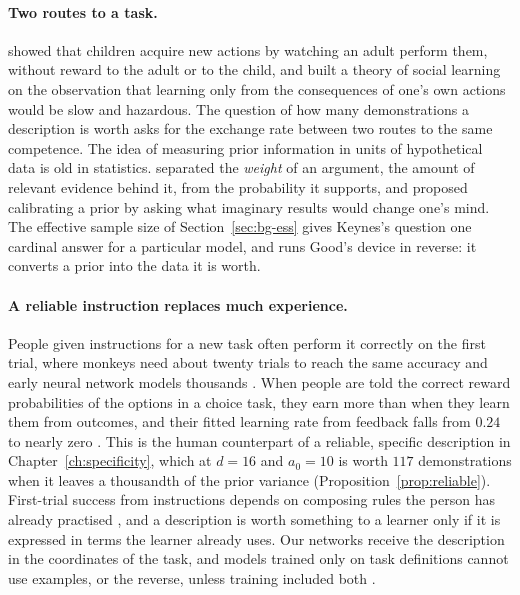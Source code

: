 \paragraph{Two routes to a task.} \citet{bandura1961} showed that children acquire new actions by watching an adult perform them, without reward to the adult or to the child, and \citet{bandura1977} built a theory of social learning on the observation that learning only from the consequences of one's own actions would be slow and hazardous. The question of how many demonstrations a description is worth asks for the exchange rate between two routes to the same competence. The idea of measuring prior information in units of hypothetical data is old in statistics. \citet{keynes1921} separated the \emph{weight} of an argument, the amount of relevant evidence behind it, from the probability it supports, and \citet{good1950} proposed calibrating a prior by asking what imaginary results would change one's mind. The effective sample size of Section~\ref{sec:bg-ess} gives Keynes's question one cardinal answer for a particular model, and runs Good's device in reverse: it converts a prior into the data it is worth.

\paragraph{A reliable instruction replaces much experience.} People given instructions for a new task often perform it correctly on the first trial, where monkeys need about twenty trials to reach the same accuracy and early neural network models thousands \citep{cole2013}. When people are told the correct reward probabilities of the options in a choice task, they earn more than when they learn them from outcomes, and their fitted learning rate from feedback falls from $0.24$ to nearly zero \citep{li2011}. This is the human counterpart of a reliable, specific description in Chapter~\ref{ch:specificity}, which at $d = 16$ and $a_0 = 10$ is worth $117$ demonstrations when it leaves a thousandth of the prior variance (Proposition~\ref{prop:reliable}). First-trial success from instructions depends on composing rules the person has already practised \citep{cole2013}, and a description is worth something to a learner only if it is expressed in terms the learner already uses. Our networks receive the description in the coordinates of the task, and models trained only on task definitions cannot use examples, or the reverse, unless training included both \citep{wang2022supernat}.

